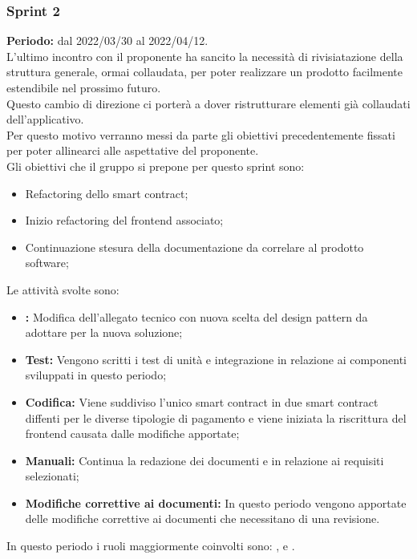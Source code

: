 \subsubsection{Sprint 2} \label{subsubsection:sprint_2}
\textbf{Periodo:} dal 2022/03/30 al 2022/04/12.
\bigskip
\\L'ultimo incontro con il proponente ha sancito la necessità di rivisiatazione della struttura generale, ormai collaudata, per poter realizzare un prodotto facilmente estendibile nel prossimo futuro.
\\Questo cambio di direzione ci porterà a dover ristrutturare elementi già collaudati dell'applicativo.
\\Per questo motivo verranno messi da parte gli obiettivi precedentemente fissati per poter allinearci alle aspettative del proponente.
\\Gli obiettivi che il gruppo si prepone per questo sprint\glo{} sono:
\begin{itemize}
  \item Refactoring dello smart contract\glo{};
  \item Inizio refactoring\glo{} del frontend\glo{} associato;
  \item Continuazione stesura della documentazione da correlare al prodotto software;
\end{itemize}
Le attività svolte sono:
\begin{itemize}
  \item \textbf{\PB{}:} Modifica dell’allegato tecnico con nuova scelta del design pattern da adottare per la nuova soluzione;
  \item \textbf{Test:} Vengono scritti i test di unità e integrazione in relazione ai componenti sviluppati in questo periodo;
  \item \textbf{Codifica:} Viene suddiviso l'unico smart contract\glo{} in due smart contract\glo{} diffenti per le diverse tipologie di pagamento e viene iniziata la riscrittura del frontend\glo{} causata dalle modifiche apportate;
  \item \textbf{Manuali:} Continua la redazione dei documenti \docNameVersionMU{} e \docNameVersionMS{} in relazione ai requisiti selezionati;
  \item \textbf{Modifiche correttive ai documenti:} In questo periodo vengono apportate delle modifiche correttive ai documenti che necessitano di una revisione.
\end{itemize}
In questo periodo i ruoli maggiormente coinvolti sono: \roleDesignerLow{}, \roleProgrammerLow{} e \roleVerifierLow{}.
